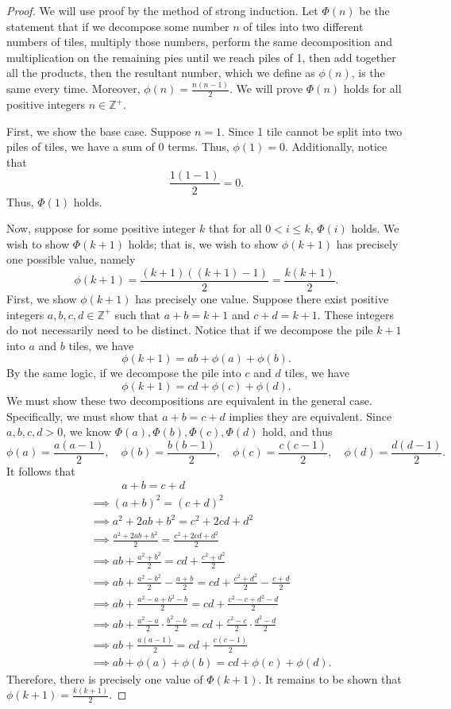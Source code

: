 \documentclass[11pt, letterpaper]{report}
\begin{document}
\begin{proof}
	We will use proof by the method of strong induction. Let $\Phi (n)$ be the statement that if we decompose some number $n$ of tiles into two different numbers of tiles, multiply those numbers, perform the same decomposition and multiplication on the remaining pies until we reach piles of 1, then add together all the products, then the resultant number, which we define as $\phi  (n)$, is the same every time. Moreover, $\phi  (n)=\frac{n(n-1)}{2}$. We will prove $\Phi (n)$ holds for all positive integers $n\in\mathbb{Z}^+$.

	First, we show the base case. Suppose $n=1$. Since 1 tile cannot be split into two piles of tiles, we have a sum of 0 terms. Thus, $\phi  (1)=0$. Additionally, notice that
	\[
		\frac{1(1-1)}{2}=0
	.\]
	Thus, $\Phi (1)$ holds.

	Now, suppose for some positive integer $k$ that for all $0<i\leq k$, $\Phi (i)$ holds. We wish to show $\Phi (k+1)$ holds; that is, we wish to show $\phi  (k+1)$ has precisely one possible value, namely
	\[
		\phi  (k+1)=\frac{(k+1)((k+1)-1)}{2}=\frac{k(k+1)}{2}
	.\]
	First, we show $\phi  (k+1)$ has precisely one value. Suppose there exist positive integers $a,b,c,d\in\mathbb{Z}^+$ such that $a+b=k+1$ and $c+d=k+1$. These integers do not necessarily need to be distinct. Notice that if we decompose the pile $k+1$ into $a$ and $b$ tiles, we have
	\[
		\phi  (k+1)=ab+\phi  (a)+\phi  (b)
	.\]
	By the same logic, if we decompose the pile into $c$ and $d$ tiles, we have
	\[
		\phi  (k+1)=cd+\phi  (c)+\phi  (d)
	.\]
	We must show these two decompositions are equivalent in the general case. Specifically, we must show that $a+b=c+d$ implies they are equivalent. Since $a,b,c,d> 0$, we know $\Phi (a),\Phi (b),\Phi (c),\Phi (d)$ hold, and thus
	\[
		\phi  (a)=\frac{a(a-1)}{2},\quad \phi  (b)=\frac{b(b-1)}{2},\quad \phi  (c)=\frac{c(c-1)}{2},\quad \phi  (d)=\frac{d(d-1)}{2}
	.\]
	It follows that
\begin{align*}
	&\qquad\;\;\; a+b=c+d\\
	&\implies (a+b)^2=(c+d)^2\\
	&\implies a^2+2ab+b^2=c^2+2cd+d^2\\
	&\implies \frac{a^2+2ab+b^2}{2}=\frac{c^2+2cd+d^2}{2}\\
	&\implies ab+\frac{a^2+b^2}{2}=cd+\frac{c^2+d^2}{2}\\
	&\implies ab+\frac{a^2-b^2}{2}-\frac{a+b}{2}=cd+\frac{c^2+d^2}{2}-\frac{c+d}{2}\\
	&\implies ab+\frac{a^2-a+b^2-b}{2}=cd+\frac{c^2-c+d^2-d}{2}\\
	&\implies ab+\frac{a^2-a}{2}\cdot \frac{b^2-b}{2}=cd+\frac{c^2-c}{2}\cdot \frac{d^2-d}{2}\\
	&\implies ab+\frac{a(a-1)}{2}=cd+\frac{c(c-1)}{2}\\
	&\implies ab+\phi  (a)+\phi  (b)=cd+\phi  (c)+\phi  (d)
.\end{align*}
Therefore, there is precisely one value of $\Phi (k+1)$. It remains to be shown that $\phi  (k+1)=\frac{k(k+1)}{2}$.


\end{proof}
\end{document}
